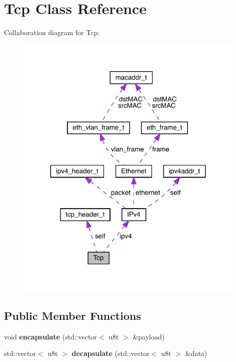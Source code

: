 \hypertarget{classTcp}{}\section{Tcp Class Reference}
\label{classTcp}


Collaboration diagram for Tcp\+:\nopagebreak
\begin{figure}[H]
\begin{center}
\leavevmode
\includegraphics[width=312pt]{classTcp__coll__graph}
\end{center}
\end{figure}
\subsection*{Public Member Functions}
\begin{DoxyCompactItemize}
\item 
\mbox{\label{classTcp_aff0ea81b11c297e17b8791a0c03a8589}} 
void {\bfseries encapsulate} (std\+::vector$<$ u8t $>$ \&payload)
\item 
\mbox{\label{classTcp_ac11613828a7a445052a338e521706ffe}} 
std\+::vector$<$ u8t $>$ {\bfseries decapsulate} (std\+::vector$<$ u8t $>$ \&data)
\end{DoxyCompactItemize}
